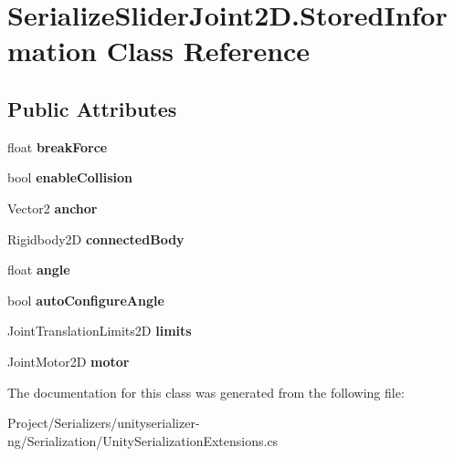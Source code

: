 \hypertarget{class_serialize_slider_joint2_d_1_1_stored_information}{}\section{Serialize\+Slider\+Joint2\+D.\+Stored\+Information Class Reference}
\label{class_serialize_slider_joint2_d_1_1_stored_information}
\subsection*{Public Attributes}
\begin{DoxyCompactItemize}
\item 
\mbox{\label{class_serialize_slider_joint2_d_1_1_stored_information_a2650e454475185f742bbf3c788aab7e7}} 
float {\bfseries break\+Force}
\item 
\mbox{\label{class_serialize_slider_joint2_d_1_1_stored_information_aa473c6cdd6671257dbf03e6638004d1b}} 
bool {\bfseries enable\+Collision}
\item 
\mbox{\label{class_serialize_slider_joint2_d_1_1_stored_information_aaccd9811fadff58f2e64e813fe118e09}} 
Vector2 {\bfseries anchor}
\item 
\mbox{\label{class_serialize_slider_joint2_d_1_1_stored_information_a85d41c4bf6d2c3ed5906c2ccd43974c4}} 
Rigidbody2D {\bfseries connected\+Body}
\item 
\mbox{\label{class_serialize_slider_joint2_d_1_1_stored_information_a4cf92e1631bca416b0641d661c431694}} 
float {\bfseries angle}
\item 
\mbox{\label{class_serialize_slider_joint2_d_1_1_stored_information_a699009abe5d65441acc7baf52c2e7f96}} 
bool {\bfseries auto\+Configure\+Angle}
\item 
\mbox{\label{class_serialize_slider_joint2_d_1_1_stored_information_ae3c2f502db284d57dc5820d037899748}} 
Joint\+Translation\+Limits2D {\bfseries limits}
\item 
\mbox{\label{class_serialize_slider_joint2_d_1_1_stored_information_a93a48365da01cce02a328b35df326eaa}} 
Joint\+Motor2D {\bfseries motor}
\end{DoxyCompactItemize}


The documentation for this class was generated from the following file\+:\begin{DoxyCompactItemize}
\item 
Project/\+Serializers/unityserializer-\/ng/\+Serialization/Unity\+Serialization\+Extensions.\+cs\end{DoxyCompactItemize}
